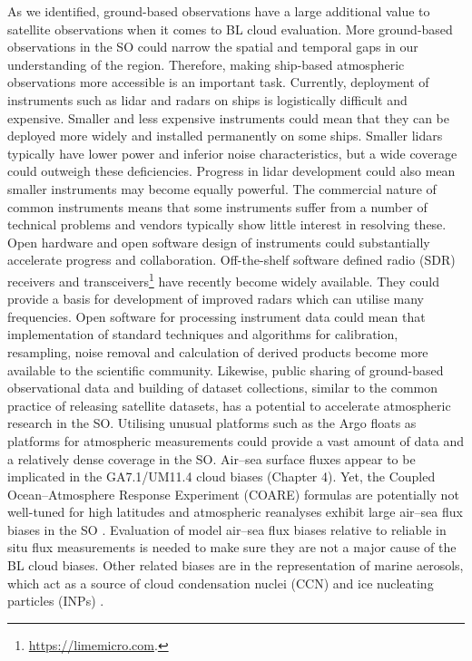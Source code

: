 As we identified, ground-based observations have a large additional value
to satellite observations when it comes to BL cloud evaluation. More
ground-based observations in the SO could narrow the spatial and temporal gaps
in our understanding of the region. Therefore, making ship-based atmospheric
observations more accessible is an important task. Currently, deployment
of instruments such as lidar and radars on ships is logistically difficult
and expensive. Smaller and less expensive instruments could mean that they
can be deployed more widely and installed permanently on some ships. Smaller
lidars typically have lower power and inferior noise characteristics,
but a wide coverage could outweigh these deficiencies. Progress in lidar
development could also mean smaller instruments may become equally powerful.
The commercial nature of common instruments means that some instruments
suffer from a number of technical problems and vendors typically show
little interest in resolving these. Open hardware and open software design of
instruments could substantially accelerate progress and collaboration.
Off-the-shelf software defined radio (SDR) receivers and
transceivers\footnote{\url{https://limemicro.com}.} have recently
become widely available. They could provide a basis for development of improved
radars which can utilise many frequencies. Open software for processing
instrument data could mean that implementation of standard techniques and
algorithms for calibration, resampling, noise removal and calculation of derived
products become more available to the scientific community. Likewise,
public sharing of ground-based observational data and building of dataset
collections, similar to the common practice of releasing satellite datasets,
has a potential to accelerate atmospheric research in the SO.
Utilising unusual platforms such as the Argo floats
\citep{roemmich2009a,roemmich2009b}
as platforms for atmospheric measurements could provide a vast amount of data and a relatively dense
coverage in the SO.
Air--sea surface fluxes appear to be implicated in the GA7.1/UM11.4 cloud biases
(Chapter 4). Yet, the Coupled Ocean–Atmosphere Response Experiment (COARE)
formulas are potentially not well-tuned for high latitudes and atmospheric
reanalyses exhibit large air--sea flux biases in the SO
\citep{cerovevcki2011}. Evaluation of model air--sea flux biases relative to
reliable in situ flux measurements is needed to make sure they are not
a major cause of the BL cloud biases. Other related biases are in the
representation of marine aerosols, which act as a source of cloud condensation
nuclei (CCN) and ice nucleating particles (INPs) \citep{hartery2020a}.

